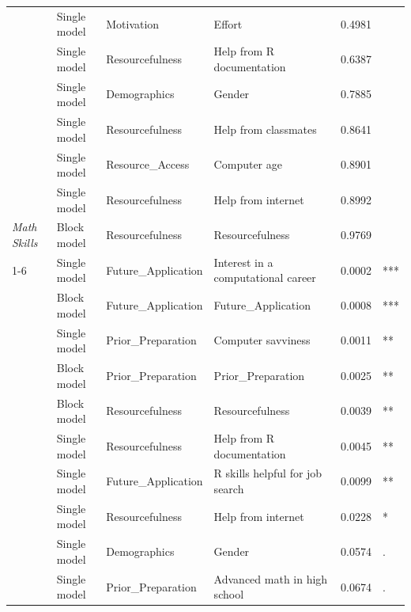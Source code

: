 \begin{table}[!h]
\begin{threeparttable}
\begin{tabular}[t]{>{}llllrl}
 & Single model & Motivation & Effort & 0.4981 & \\

 & Single model & Resourcefulness & Help from R documentation & 0.6387 & \\

 & Single model & Demographics & Gender & 0.7885 & \\

 & Single model & Resourcefulness & Help from classmates & 0.8641 & \\

 & Single model & Resource_Access & Computer age & 0.8901 & \\

 & Single model & Resourcefulness & Help from internet & 0.8992 & \\

\multirow[t]{-19}{*}[\normalbaselineskip]{\raggedright\arraybackslash \em{Math Skills}} & Block model & Resourcefulness & Resourcefulness & 0.9769 & \\
\cmidrule{1-6}
 & Single model & Future_Application & Interest in a computational career & 0.0002 & ***\\

 & Block model & Future_Application & Future_Application & 0.0008 & ***\\

 & Single model & Prior_Preparation & Computer savviness & 0.0011 & **\\

 & Block model & Prior_Preparation & Prior_Preparation & 0.0025 & **\\

 & Block model & Resourcefulness & Resourcefulness & 0.0039 & **\\

 & Single model & Resourcefulness & Help from R documentation & 0.0045 & **\\

 & Single model & Future_Application & R skills helpful for job search & 0.0099 & **\\

 & Single model & Resourcefulness & Help from internet & 0.0228 & *\\

 & Single model & Demographics & Gender & 0.0574 & .\\

 & Single model & Prior_Preparation & Advanced math in high school & 0.0674 & .\\


\end{tabular}
\end{threeparttable}
\end{table}
